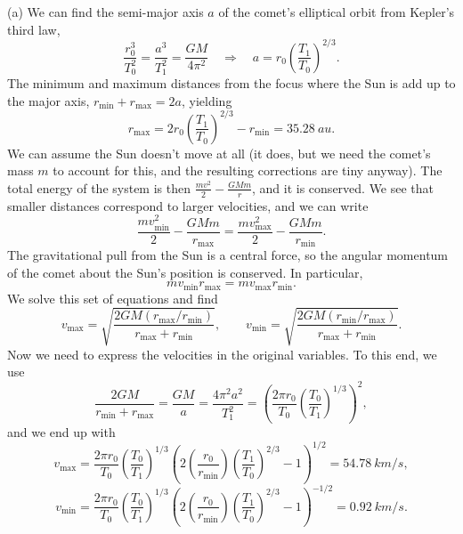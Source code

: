 \documentclass[../TST.tex]{subfiles}
\begin{document}
\begin{solution} (a) We can find the semi-major axis $a$ of the comet's elliptical orbit from Kepler's third law,
	\begin{equation*}
		\frac{r_0^3}{T_0^2}=\frac{a^3}{T_1^2}=\frac{GM}{4\pi^2} \quad\Rightarrow\quad a=r_0\left(\frac{T_1}{T_0}\right)^{2/3}
	.
	\end{equation*}
The minimum and maximum distances from the focus where the Sun is add up to the major axis, $r_\mathrm{min}+r_\mathrm{max}=2a$, yielding
\begin{equation*}
	\boxed{r_\mathrm{max}=2r_0\left(\frac{T_1}{T_0}\right)^{2/3}-r_\mathrm{min}=\qty{35.28}{au}.}
\end{equation*}
We can assume the Sun doesn't move at all (it does, but we need the comet's mass $m$ to account for this, and the resulting corrections are tiny anyway). The total energy of the system is then $\frac{mv^2}{2}-\frac{GMm}{r}$, and it is conserved. We see that smaller distances correspond to larger velocities, and we can write
\begin{equation*}
\frac{mv_\mathrm{min}^2}{2}-\frac{GMm}{r_\mathrm{max}}=\frac{mv_\mathrm{max}^2}{2}-\frac{GMm}{r_\mathrm{min}}
.
\end{equation*}
The gravitational pull from the Sun is a central force, so the angular momentum of the comet about the Sun's position is conserved. In particular,
\begin{equation*}
mv_\mathrm{min}r_\mathrm{max}=mv_\mathrm{max}r_\mathrm{min}
.
\end{equation*}
We solve this set of equations and find
\begin{equation*}
	v_\mathrm{max}=\sqrt{\frac{2GM(r_\mathrm{max}/r_\mathrm{min})}{r_\mathrm{max}+r_\mathrm{min}}}, \quad\quad v_\mathrm{min}=\sqrt{\frac{2GM(r_\mathrm{min}/r_\mathrm{max})}{r_\mathrm{max}+r_\mathrm{min}}}
.
\end{equation*}
Now we need to express the velocities in the original variables. To this end, we use 
\begin{equation*}
	\frac{2GM}{r_\mathrm{min}+r_\mathrm{max}}=\frac{GM}{a}=\frac{4\pi^2 a^2}{T_1^2}=\left(\frac{2\pi r_0}{T_0}\left(\frac{T_0}{T_1}\right)^{1/3} \right)^2
,
\end{equation*}
and we end up with
\begin{equation*}
	\boxed{v_\mathrm{max}=\frac{2\pi r_0}{T_0}\left(\frac{T_0}{T_1}\right)^{1/3}\left(2\left(\frac{r_0}{r_\mathrm{min}}\right)\left(\frac{T_1}{T_0}\right)^{2/3}-1 \right)^{1/2}=\qty{54.78}{km/s},}
\end{equation*}
\begin{equation*}
	\boxed{v_\mathrm{min}=\frac{2\pi r_0}{T_0}\left(\frac{T_0}{T_1}\right)^{1/3}\left(2\left(\frac{r_0}{r_\mathrm{min}}\right)\left(\frac{T_1}{T_0}\right)^{2/3}-1 \right)^{-1/2}=\qty{0.92}{km/s}.}
\end{equation*}
\end{solution}
\fi
\end{document}
